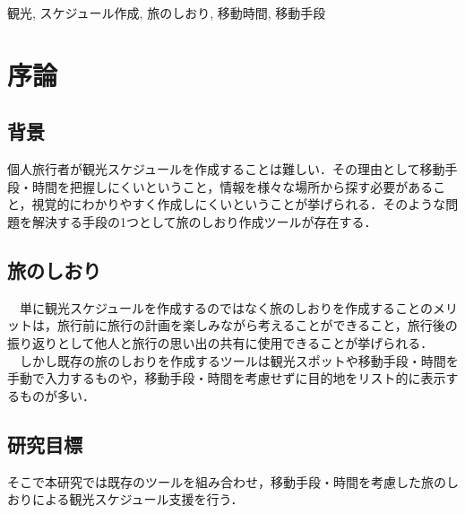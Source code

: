 \documentclass{funthesis}
\begin{document}
\begin{jkeyword}
観光, スケジュール作成, 旅のしおり, 移動時間, 移動手段
\end{jkeyword}

\tableofcontents %


\chapter{序論} %



\section{背景} %

個人旅行者が観光スケジュールを作成することは難しい．その理由として移動手段・時間を把握しにくいということ，情報を様々な場所から探す必要があること，視覚的にわかりやすく作成しにくいということが挙げられる．そのような問題を解決する手段の1つとして旅のしおり作成ツールが存在する．\\



\section{旅のしおり}
　単に観光スケジュールを作成するのではなく旅のしおりを作成することのメリットは，旅行前に旅行の計画を楽しみながら考えることができること，旅行後の振り返りとして他人と旅行の思い出の共有に使用できることが挙げられる．\\
　しかし既存の旅のしおりを作成するツールは観光スポットや移動手段・時間を手動で入力するものや，移動手段・時間を考慮せずに目的地をリスト的に表示するものが多い．\\


\section{研究目標}
そこで本研究では既存のツールを組み合わせ，移動手段・時間を考慮した旅のしおりによる観光スケジュール支援を行う．\\
\end{document}
